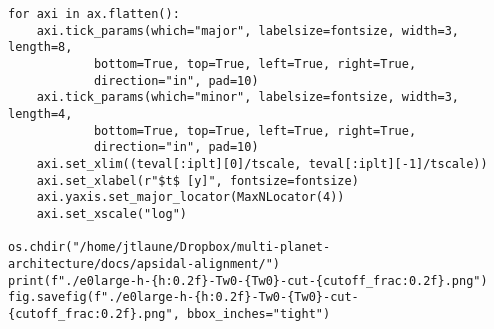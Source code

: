 \documentclass[11pt]{article}
\begin{document}
\begin{verbatim}
for axi in ax.flatten():
    axi.tick_params(which="major", labelsize=fontsize, width=3, length=8,
		    bottom=True, top=True, left=True, right=True,
		    direction="in", pad=10)
    axi.tick_params(which="minor", labelsize=fontsize, width=3, length=4,
		    bottom=True, top=True, left=True, right=True,
		    direction="in", pad=10)
    axi.set_xlim((teval[:iplt][0]/tscale, teval[:iplt][-1]/tscale))
    axi.set_xlabel(r"$t$ [y]", fontsize=fontsize)
    axi.yaxis.set_major_locator(MaxNLocator(4))
    axi.set_xscale("log")

os.chdir("/home/jtlaune/Dropbox/multi-planet-architecture/docs/apsidal-alignment/")
print(f"./e0large-h-{h:0.2f}-Tw0-{Tw0}-cut-{cutoff_frac:0.2f}.png")
fig.savefig(f"./e0large-h-{h:0.2f}-Tw0-{Tw0}-cut-{cutoff_frac:0.2f}.png", bbox_inches="tight")
\end{verbatim}
\end{document}
